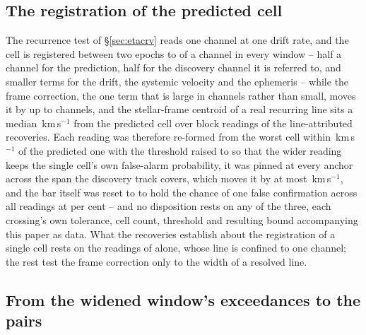 \subsection{The registration of the predicted cell}
\label{sec:regbudget}

The recurrence test of \S\ref{sec:etacrv} reads one channel at one drift
rate, and the cell is registered between two epochs to \RgBudgetChMed{} of a
channel in every window -- half a channel for the prediction, half for the
discovery channel it is referred to, and smaller terms for the drift, the
systemic velocity and the ephemeris -- while the frame correction, the one
term that is large in channels rather than small, moves it by up to
\ZtFrameChanMax{} channels, and the stellar-frame centroid of a real
recurring line sits a median \RgCenMedKms\,km\,s$^{-1}$ from the predicted
cell over \RgCenNBlock{} block readings of the line-attributed recoveries.
Each reading was therefore re-formed from the worst cell within
\RgTolKms\,km\,s$^{-1}$ of the predicted one with the threshold raised to
\RgThrMax{} so that the wider reading keeps the single cell's own false-alarm
probability, it was pinned at every anchor across the span the discovery track
covers, which moves it by at most \AnSpanMaxKms\,km\,s$^{-1}$, and the bar
itself was reset to \ZtTrialThr{} to hold the chance of one false confirmation
across all \RcNRepeatMeas{} readings at \ZtFwPct{} per cent -- and no
disposition rests on any of the three, each crossing's own tolerance, cell
count, threshold and resulting bound accompanying this paper as data. What the
recoveries establish about the registration of a single cell rests on the
\RgRegNUnres{} readings of \RgRegStar{} alone, whose line is confined to one
channel; the rest test the frame correction only to the width of a resolved
line.

\subsection{From the widened window's exceedances to the pairs}
\label{sec:pairacct}

